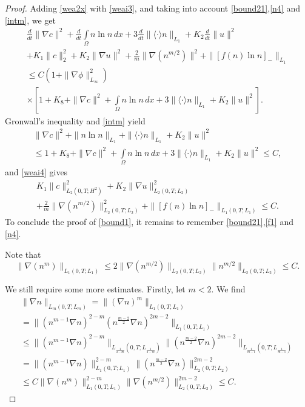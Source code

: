 \documentclass[10pt]{amsart}
\begin{document}
\begin{proof}
Adding \eqref{wea2x} with  \eqref{weai3}, and taking into account \eqref{bound21},\eqref{n4} and \eqref{intm}, we get 
\begin{multline}\label{weai4}
\frac {d}{dt} \|\nabla c\|^2 + \frac {d}{dt} \int\limits_{\Omega} n\ln n \, dx+3\frac {d}{dt} \|\langle\cdot\rangle n\|_{L_1}+ K_2\frac {d}{dt} \|u\|^2 \\ +K_1 \|c\|^2_2 + K_2 \|\nabla u\|^2+ \frac 2 m \|\nabla(n^{m/2})\|^2 + \|[f(n)\ln n]_-\|_{L_1} \\ \leq C(1+ \|\nabla\phi \|^2_{L_\infty}) \\ \times\left[1+ K_8+\|\nabla c\|^2+ \int\limits_{\Omega} n\ln n \, dx+ 3\| \langle\cdot\rangle n\|_{L_{1}}+K_2\|u\|^2\right].
\end{multline}
Gronwall's inequality and \eqref{intm} yield
\begin{multline}\label{weai5} \|\nabla c\|^2+ \|n\ln n\|_{L_1}+ \| \langle\cdot\rangle n\|_{L_{1}}+K_2\|u\|^2 \\ \leq 1+ K_8+\|\nabla c\|^2+ \int\limits_{\Omega} n\ln n \, dx+ 3\| \langle\cdot\rangle n\|_{L_{1}}+K_2\|u\|^2\leq C,
\end{multline}
and \eqref{weai4} gives \begin{multline} \label{weai6} K_1 \|c\|^2_{L_2(0,T;H^2)} + K_2 \|\nabla u\|^2_{L_2(0,T;L_2)} \\ + \frac 2 m \|\nabla(n^{m/2})\|^2_{L_2(0,T;L_2)} + \|[f(n)\ln n]_-\|_{L_1(0,T;L_1)}\leq C.\end{multline}
To conclude the proof of \eqref{bound1}, it remains to remember \eqref{bound21},\eqref{f1} and \eqref{n4}.

Note that \begin{equation}\label{boundn}\|\nabla (n^m)\|_{L_1(0,T;L_1)}\leq 2 \|\nabla (n^{m/2})\|_{L_2(0,T;L_2)}\|n^{m/2}\|_{L_2(0,T;L_2)}\leq C.\end{equation}

We still require some more estimates. Firstly, let $m< 2$. We find \begin{multline}\label{smm}\|\nabla n\|_{L_{m}(0,T;L_{m})}= \|(\nabla n)^m\|_{L_{1}(0,T;L_{1})} \\ = \|(n^{m-1}\nabla n )^{2-m}(n^{\frac {m-2}2}\nabla n )^{2m-2}\|_{L_{1}(0,T;L_{1})} \\ \leq \|(n^{m-1}\nabla n )^{2-m}\|_{L_{\frac 1 {2-m}}(0,T;L_{\frac 1 {2-m}})}\|(n^{\frac {m-2}2}\nabla n )^{2m-2}\|_{L_{\frac 1 {m-1}}(0,T;L_{\frac 1 {m-1}})} \\ =\|(n^{m-1}\nabla n )\|^{2-m}_{L_{1}(0,T;L_{1})}\|(n^{\frac {m-2}2}\nabla n )\|^{2m-2}_{L_{2}(0,T;L_{2})} \\ \leq C\|\nabla (n^m) \|^{2-m}_{L_{1}(0,T;L_{1})}\|\nabla (n^{m/2}) \|^{2m-2}_{L_{2}(0,T;L_{2})}\leq C.\end{multline}


\end{proof}
\end{document}
